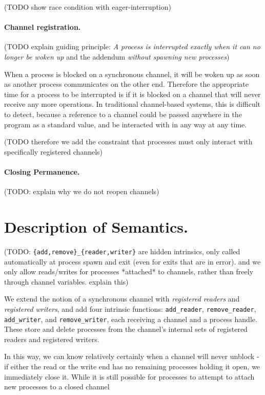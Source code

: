 \documentclass[sigplan,10pt,nosumlimits]{acmart}
\begin{document}
(TODO show race condition with eager-interruption)

\paragraph{Channel registration.}

(TODO explain guiding principle: \emph{A process is interrupted exactly when it can no longer be woken up} and the addendum \emph{without spawning new processes})

When a process is blocked on a synchronous channel, it will be woken up as soon as another process communicates on the other end.
Therefore the appropriate time for a process to be interrupted is if it is blocked on a channel that will never receive any more operations.
In traditional channel-based systems, this is difficult to detect, because a reference to a channel could be passed anywhere in the program as a standard value, and be interacted with in any way at any time.

(TODO therefore we add the constraint that processes must only interact with specifically registered channels)

\paragraph{Closing Permanence.}
(TODO: explain why we do not reopen channels)

\section{Description of Semantics.}

(TODO: \verb/{add,remove}_{reader,writer}/ are hidden intrinsics, only called automatically at process spawn and exit (even for exits that are in error). and we only allow reads/writes for processes *attached* to channels, rather than freely through channel variables. explain this)

We extend the notion of a synchronous channel with \emph{registered readers} and \emph{registered writers}, and add four intrinsic functions: \verb/add_reader/, \verb/remove_reader/, \verb/add_writer/, and \verb/remove_writer/, each receiving a channel and a process handle.
These store and delete processes from the channel's internal sets of registered readers and registered writers.

In this way, we can know relatively certainly when a channel will never unblock - if either the read or the write end has no remaining processes holding it open, we immediately close it. While it is still possible for processes to attempt to attach new processes to a closed channel
\end{document}
